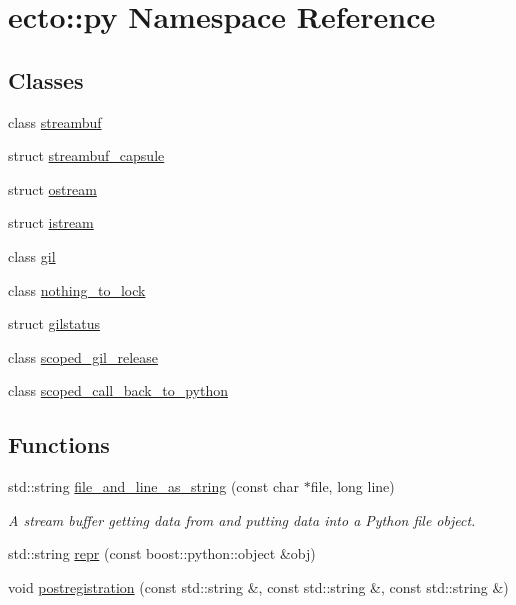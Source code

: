 \hypertarget{namespaceecto_1_1py}{\section{ecto\-:\-:py Namespace Reference}
\label{namespaceecto_1_1py}
}
\subsection*{Classes}
\begin{DoxyCompactItemize}
\item 
class \hyperlink{classecto_1_1py_1_1streambuf}{streambuf}
\item 
struct \hyperlink{structecto_1_1py_1_1streambuf__capsule}{streambuf\-\_\-capsule}
\item 
struct \hyperlink{structecto_1_1py_1_1ostream}{ostream}
\item 
struct \hyperlink{structecto_1_1py_1_1istream}{istream}
\item 
class \hyperlink{classecto_1_1py_1_1gil}{gil}
\item 
class \hyperlink{classecto_1_1py_1_1nothing__to__lock}{nothing\-\_\-to\-\_\-lock}
\item 
struct \hyperlink{structecto_1_1py_1_1gilstatus}{gilstatus}
\item 
class \hyperlink{classecto_1_1py_1_1scoped__gil__release}{scoped\-\_\-gil\-\_\-release}
\item 
class \hyperlink{classecto_1_1py_1_1scoped__call__back__to__python}{scoped\-\_\-call\-\_\-back\-\_\-to\-\_\-python}
\end{DoxyCompactItemize}
\subsection*{Functions}
\begin{DoxyCompactItemize}
\item 
std\-::string \hyperlink{namespaceecto_1_1py_a103dc3e3c8ee425860ae2260f930752e}{file\-\_\-and\-\_\-line\-\_\-as\-\_\-string} (const char $\ast$file, long line)
\begin{DoxyCompactList}\small\item\em A stream buffer getting data from and putting data into a Python file object. \end{DoxyCompactList}\item 
std\-::string \hyperlink{namespaceecto_1_1py_abc1149eb9720c52fa9191bf7ee10ccf2}{repr} (const boost\-::python\-::object \&obj)
\item 
void \hyperlink{namespaceecto_1_1py_a9baa9f1e5394841101cbdc2eab37094c}{postregistration} (const std\-::string \&, const std\-::string \&, const std\-::string \&)
\end{DoxyCompactItemize}


